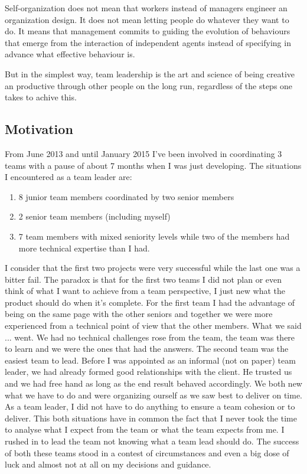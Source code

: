 \begin{displayquote}
Self-organization does not mean that workers instead of managers engineer an organization design. It does not mean letting people do whatever they want to do. It means that management commits to guiding the evolution of behaviours that emerge from the interaction of independent agents instead of specifying in advance what effective behaviour is.
\end{displayquote}

But in the simplest way, team leadership is the art and science of being creative an productive through other people on the long run, regardless of the steps one takes to achive this.


\subsection{Motivation}
\label{sub-sec:motivation}

From June 2013 and until January 2015 I've been involved in coordinating 3 teams with a pause of about 7 months when I was just developing. The situations I encountered as a team leader are:

\begin{enumerate}
\item 8 junior team members coordinated by two senior members
\item 2 senior team members (including myself)
\item 7 team members with mixed seniority levels while two of the members had more technical expertise than I had.
\end{enumerate}

I consider that the first two projects were very successful while the last one was a bitter fail. The paradox is that for the first two teams I did not plan or even think of what I want to achieve from a team perspective, I just new what the product should do when it's complete. For the first team I had the advantage of being on the same page with the other seniors and together we were more experienced from a technical point of view that the other members. What we said ... went. We had no technical challenges rose from the team, the team was there to learn and we were the ones that had the answers. The second team was the easiest team to lead. Before I was appointed as an informal (not on paper) team leader, we had already formed good relationships with the client. He trusted us and we had free hand as long as the end result behaved accordingly. We both new what we have to do and were organizing ourself as we saw best to deliver on time. As a team leader, I did not have to do anything to ensure a team cohesion or to deliver. This both situations have in common the fact that I never took the time to analyse what I expect from the team or what the team  expects from me. I rushed in to lead the team not knowing what a team lead should do. The success of both these teams stood in a contest of circumstances and even a big dose of luck and almost not at all on my decisions and guidance.


